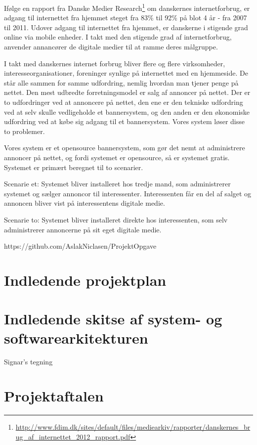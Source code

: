 \documentclass[a4paper,12pt]{article}
\begin{document}
Ifølge en rapport fra Danske Medier Research\footnote{\url{ http://www.fdim.dk/sites/default/files/mediearkiv/rapporter/danskernes\_brug\_af\_internettet\_2012\_rapport.pdf}} om danskernes internetforbrug, er adgang til internettet fra hjemmet steget fra 83\% til 92\% på blot 4 år - fra 2007 til 2011. Udover adgang til internettet fra hjemmet, er danskerne i stigende grad online via mobile enheder. I takt med den stigende grad af internetforbrug, anvender annancører de digitale medier til at ramme deres målgruppe.

I takt med danskernes internet forbrug bliver flere og flere virksomheder, interesseorganisationer, foreninger synlige på internettet med en hjemmeside. De står alle sammen for samme udfordring, nemlig hvordan man tjener penge på nettet. Den mest udbredte forretningsmodel er salg af annoncer på nettet. Der er to udfordringer ved at annoncere på nettet, den ene er den tekniske udfordring ved at selv skulle vedligeholde et bannersystem, og den anden er den økonomiske udfordring ved at købe sig adgang til et bannersystem. Vores system løser disse to problemer.

Vores system er et opensource bannersystem, som gør det nemt at administrere annoncer på nettet, og fordi systemet er opensource, så er systemet gratis. Systemet er primært beregnet til to scenarier.

Scenarie et: Systemet bliver installeret hos tredje mand, som administrerer systemet og sælger annoncor til interessenter. Interessenten får en del af salget og annoncen bliver vist på interessentens digitale medie.

Scenarie to: Systemet bliver installeret direkte hos interessenten, som selv administrerer annoncerne på sit eget digitale medie.



https://github.com/AslakNiclasen/ProjektOpgave

\section{Indledende projektplan}

\section{Indledende skitse af system- og softwarearkitekturen}

Signar's tegning 

\section{Projektaftalen}
\end{document}
